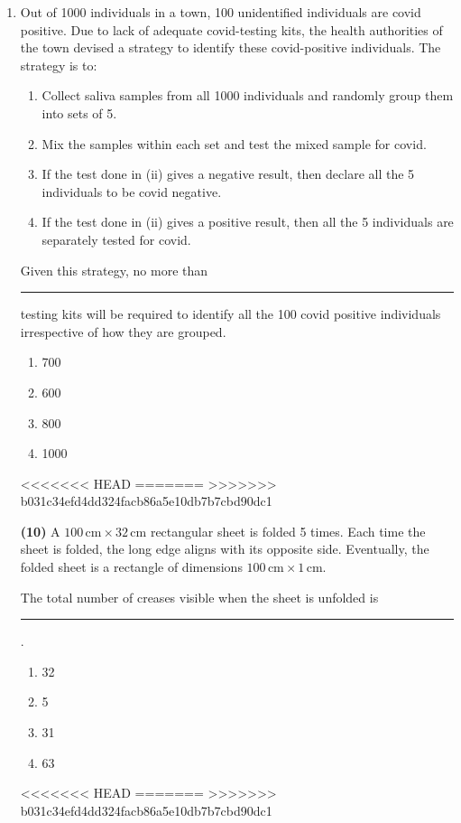 \documentclass[journal]{IEEEtran}
\begin{document}
\begin{enumerate}
  \item 
Out of 1000 individuals in a town, 100 unidentified individuals are covid positive. Due to lack of adequate covid-testing kits, the health authorities of the town devised a strategy to identify these covid-positive individuals. The strategy is to:

\begin{enumerate}[label=(\roman*)]
    \item Collect saliva samples from all 1000 individuals and randomly group them into sets of 5.
    \item Mix the samples within each set and test the mixed sample for covid.
    \item If the test done in (ii) gives a negative result, then declare all the 5 individuals to be covid negative.
    \item If the test done in (ii) gives a positive result, then all the 5 individuals are separately tested for covid.
\end{enumerate}

Given this strategy, no more than \rule{2cm}{0.15mm} testing kits will be required to identify all the 100 covid positive individuals irrespective of how they are grouped.



\begin{enumerate}
    \item 700
    \item 600
    \item 800
    \item 1000
    \end{enumerate}
<<<<<<< HEAD
    \hfill{}
=======
    \hfill{}
>>>>>>> b031c34efd4dd324facb86a5e10db7b7cbd90dc1
    
   \textbf {(10)}
A \(100 \, \text{cm} \times 32 \, \text{cm}\) rectangular sheet is folded 5 times. Each time the sheet is folded, the long edge aligns with its opposite side. Eventually, the folded sheet is a rectangle of dimensions \(100 \, \text{cm} \times 1 \, \text{cm}\).



The total number of creases visible when the sheet is unfolded is \rule{2cm}{0.15mm}.



\begin{enumerate}
    \item 32
    \item 5
    \item 31
    \item 63
\end{enumerate}
<<<<<<< HEAD
\hfill{}
=======
\hfill{}
>>>>>>> b031c34efd4dd324facb86a5e10db7b7cbd90dc1


\end{enumerate}
\end{document}

